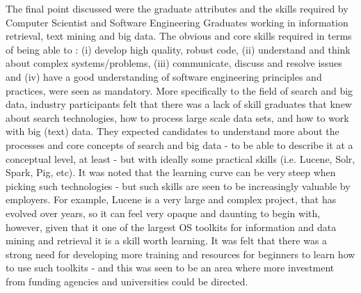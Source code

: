 The final point discussed were the graduate attributes and the skills required by Computer Scientist and Software Engineering Graduates working in information retrieval, text mining and big data. 
The obvious and core skills required in terms of being able to : (i) develop high quality, robust code, (ii) understand and think about complex systems/problems, (iii) communicate, discuss and resolve issues and (iv) have a good understanding of software engineering principles and practices, were seen as mandatory. 
More specifically to the field of search and big data, industry participants felt that there was a lack of skill graduates that knew about search technologies, how to process large scale data sets, and how to work with big (text) data. 
They expected candidates to understand more about the processes and core concepts of search and big data - to be able to describe it at a conceptual level, at least - but with ideally some practical skills (i.e. Lucene, Solr, Spark, Pig, etc). 
It was noted that the learning curve can be very steep when picking such technologies - but such skills are seen to be increasingly valuable by employers. 
For example, Lucene is a very large and complex project, that has evolved over years, so it can feel very opaque and daunting to begin with, however, given that it one of the largest OS toolkits for information and data mining and retrieval it is a skill worth learning. 
It was felt that there was a strong need for developing more training and resources for beginners to learn how to use such toolkits - and this was seen to be an area where more investment from funding agencies and universities could be directed. 







